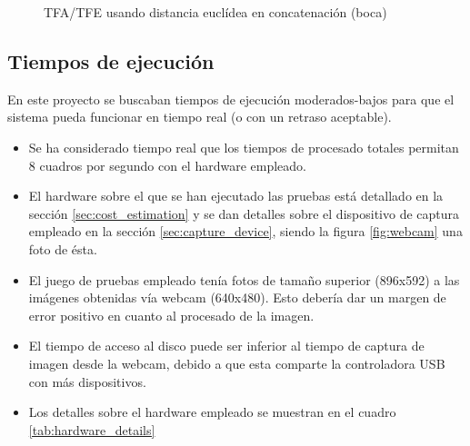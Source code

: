 \begin{figure}[!htb]
	\centering
			\resizebox{7.25cm}{!}{}
			\resizebox{7.25cm}{!}{}
			\resizebox{7.25cm}{!}{}
			\resizebox{7.25cm}{!}{}
        \caption{TFA/TFE usando distancia euclídea en concatenación (boca)}
        \label{fig:concat-euc-b}
\end{figure}

\clearpage

\subsection{Tiempos de ejecución}
En este proyecto se buscaban tiempos de ejecución moderados-bajos para que el sistema pueda funcionar en tiempo real (o con un retraso aceptable).
\begin{itemize}
	\item{Se ha considerado tiempo real que los tiempos de procesado totales permitan 8 cuadros por segundo con el hardware empleado.}
	\item{El hardware sobre el que se han ejecutado las pruebas está detallado en la sección \ref{sec:cost_estimation} y se dan detalles sobre el dispositivo de captura empleado en la sección \ref{sec:capture_device}, siendo la figura \ref{fig:webcam} una foto de ésta.}
	\item{El juego de pruebas empleado tenía fotos de tamaño superior (896x592) a las imágenes obtenidas vía webcam (640x480). Esto debería dar un margen de error positivo en cuanto al procesado de la imagen.}
	\item{El tiempo de acceso al disco puede ser inferior al tiempo de captura de imagen desde la webcam, debido a que esta comparte la controladora USB con más dispositivos.}
	\item{Los detalles sobre el hardware empleado se muestran en el cuadro \ref{tab:hardware_details}}
\end{itemize}

